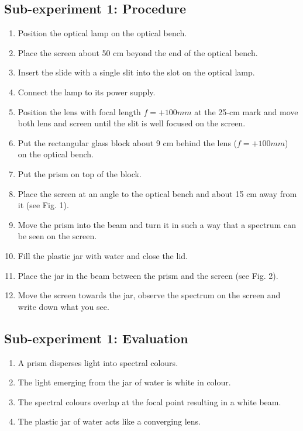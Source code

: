 \documentclass[12pt]{article}
\begin{document}
\subsection*{Sub-experiment 1: Procedure}
\begin{enumerate}
    \item Position the optical lamp on the optical bench. 
    \item Place the screen about 50 cm beyond the end of the optical bench. 
    \item Insert the slide with a single slit into the slot on the optical lamp. 
    \item Connect the lamp to its power supply. 
    \item Position the lens with focal length $f = + 100 mm$ at the 25-cm mark and move both lens and screen until the slit is well focused on the screen. 
    \item Put the rectangular glass block about 9 cm behind the lens ($f = + 100 mm$) on the optical bench.
    \item Put the prism on top of the block.
    \item Place the screen at an angle to the optical bench and about 15 cm away from it (see Fig. 1). 
    \item Move the prism into the beam and turn it in such a way that a spectrum can be seen on the screen. 
    \item Fill the plastic jar with water and close the lid. 
    \item Place the jar in the beam between the prism and the screen (see Fig. 2).
    \item Move the screen towards the jar, observe the spectrum on the screen and write down what you see. 
\end{enumerate}

\subsection*{Sub-experiment 1: Evaluation}
\begin{enumerate}
    \item A prism disperses light into spectral colours. 
    \item The light emerging from the jar of water is white in colour. 
    \item The spectral colours overlap at the focal point resulting in a white beam. 
    \item The plastic jar of water acts like a converging lens.  
\end{enumerate}
\end{document}
